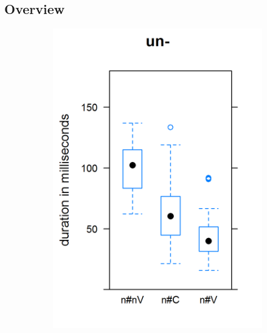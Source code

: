 \subsection{Overview}\label{overview corpus}



\begin{figure}[t!]
	\begin{center}
		
		
		\begin{subfigure}
			\centering
			\includegraphics[scale=.55]{images/Corpus/boxUn.png}
		\end{subfigure}%
		~
		\begin{subfigure}
			\centering

\end{subfigure}
\end{center}
\end{figure}
